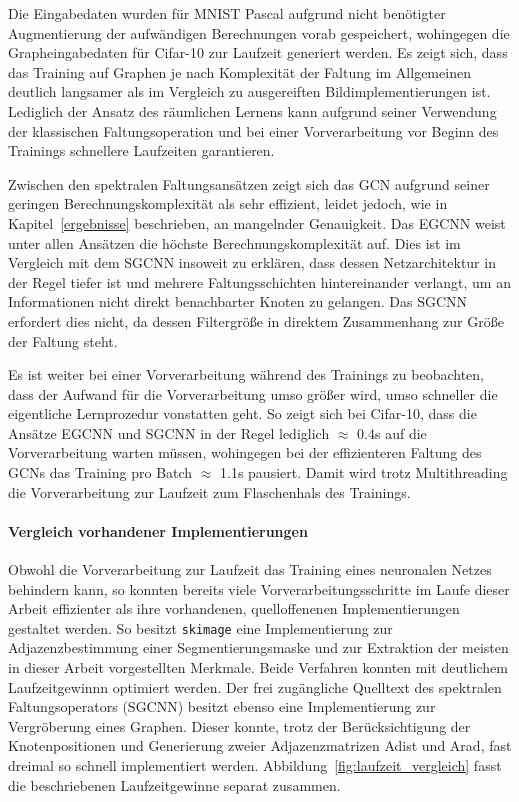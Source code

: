 Die Eingabedaten wurden für \gls{MNIST} \bzw{} \gls{Pascal} aufgrund nicht benötigter Augmentierung \bzw{} der aufwändigen Berechnungen vorab gespeichert, wohingegen die Graph\-ein\-ga\-be\-da\-ten für \gls{Cifar}-10 zur Laufzeit generiert werden.
Es zeigt sich, dass das Training auf Graphen je nach Komplexität der Faltung im Allgemeinen deutlich langsamer als im Vergleich zu ausgereiften Bildimplementierungen ist.
Lediglich der Ansatz des räumlichen Lernens kann aufgrund seiner Verwendung der klassischen Faltungsoperation und bei einer Vorverarbeitung vor Beginn des Trainings schnellere Laufzeiten garantieren.

Zwischen den spektralen Faltungsansätzen zeigt sich das \acs{GCN} aufgrund seiner geringen Berechnungskomplexität als sehr effizient, leidet jedoch, wie in Kapitel~\ref{ergebnisse} beschrieben, an mangelnder Genauigkeit.
Das \acs{EGCNN} weist unter allen Ansätzen die höchste Berechnungskomplexität auf.
Dies ist im Vergleich mit dem \acs{SGCNN} insoweit zu erklären, dass dessen Netzarchitektur in der Regel tiefer ist und mehrere Faltungsschichten hintereinander verlangt, um an Informationen nicht direkt benachbarter Knoten zu gelangen.
Das \acs{SGCNN} erfordert dies nicht, da dessen Filtergröße in direktem Zusammenhang zur Größe der Faltung steht.

Es ist weiter bei einer Vorverarbeitung während des Trainings zu beobachten, dass der Aufwand für die Vorverarbeitung umso größer wird, umso schneller die eigentliche Lernprozedur vonstatten geht.
So zeigt sich \bspw{} bei \gls{Cifar}-10, dass die Ansätze \acs{EGCNN} und \acs{SGCNN} in der Regel lediglich $\approx$ 0.4s auf die Vorverarbeitung warten müssen, wohingegen bei der effizienteren Faltung des \acs{GCN}s das Training pro Batch $\approx$ 1.1s pausiert.
Damit wird trotz Multithreading die Vorverarbeitung zur Laufzeit zum Flaschenhals des Trainings.

\paragraph{Vergleich \bzgl{} vorhandener Implementierungen}
\label{vergleich_laufzeit}

Obwohl die Vorverarbeitung zur Laufzeit das Training eines neuronalen Netzes behindern kann, so konnten bereits viele Vorverarbeitungsschritte im Laufe dieser Arbeit effizienter als ihre vorhandenen, quelloffenenen Implementierungen gestaltet werden.
So besitzt \bspw{} \texttt{skimage} eine Implementierung zur Adjazenzbestimmung einer Segmentierungsmaske und zur Extraktion der meisten in dieser Arbeit vorgestellten Merkmale.
Beide Verfahren konnten mit deutlichem Laufzeitgewinnn optimiert werden.
Der frei zugängliche Quelltext des spektralen Faltungsoperators (\acs{SGCNN}) besitzt ebenso eine Implementierung zur Vergröberung eines Graphen.
Dieser konnte, trotz der Berücksichtigung der Knotenpositionen und Generierung zweier Adjazenzmatrizen \gls{Adist} und \gls{Arad}, fast dreimal so schnell implementiert werden.
Abbildung~\ref{fig:laufzeit_vergleich} fasst die beschriebenen Laufzeitgewinne separat zusammen.

